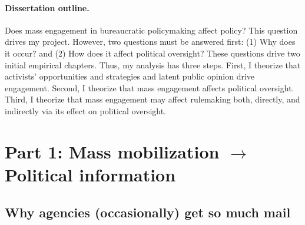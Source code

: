 \documentclass{article}
\begin{document}
\paragraph{Dissertation outline.}
Does mass engagement in bureaucratic policymaking affect policy? This question drives my project. However, two questions must be answered first: (1) Why does it occur? and (2) How does it affect political oversight? These questions drive two initial empirical chapters. Thus, my analysis has three steps.
First, I theorize that activists' opportunities and strategies and latent public opinion drive engagement. Second, I theorize that mass engagement affects political oversight. Third, I theorize that mass engagement may affect rulemaking both, directly, and indirectly via its effect on political oversight.



\section{Part 1: Mass mobilization $\rightarrow$ Political information}
\subsection{Why agencies (occasionally) get so much mail} \label{whymail-intro}

\end{document}
